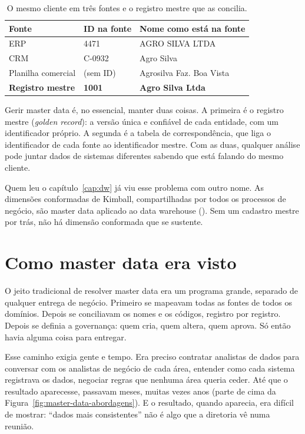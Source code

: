 \begin{table}[htbp]
  \centering
  \caption{O mesmo cliente em três fontes e o registro mestre que as concilia.}
  \label{tab:registro-mestre}
  \small
  \begin{tabular}{@{}lll@{}}
    \toprule
    Fonte & ID na fonte & Nome como está na fonte \\
    \midrule
    ERP                & 4471          & AGRO SILVA LTDA \\
    CRM                & C-0932        & Agro Silva \\
    Planilha comercial & (sem ID)      & Agrosilva Faz. Boa Vista \\
    \midrule
    \textbf{Registro mestre} & \textbf{1001} & \textbf{Agro Silva Ltda} \\
    \bottomrule
  \end{tabular}
\end{table}

Gerir master data é, no essencial, manter duas coisas. A primeira é o registro mestre
(\emph{golden record}): a versão única e confiável de cada entidade, com um identificador
próprio. A segunda é a tabela de correspondência, que liga o identificador de cada fonte ao
identificador mestre. Com as duas, qualquer análise pode juntar dados de sistemas
diferentes sabendo que está falando do mesmo cliente.

Quem leu o capítulo~\ref{cap:dw} já viu esse problema com outro nome. As dimensões
conformadas de Kimball, compartilhadas por todos os processos de negócio, são master data
aplicado ao data warehouse (). Sem um cadastro mestre por trás, não há
dimensão conformada que se sustente.

\section{Como master data era visto}
\label{sec:master-data-antes}

O jeito tradicional de resolver master data era um programa grande, separado de qualquer
entrega de negócio. Primeiro se mapeavam todas as fontes de todos os domínios. Depois se
conciliavam os nomes e os códigos, registro por registro. Depois se definia a governança:
quem cria, quem altera, quem aprova. Só então havia alguma coisa para entregar.

Esse caminho exigia gente e tempo. Era preciso contratar analistas de dados para
conversar com os analistas de negócio de cada área, entender como cada sistema registrava
os dados, negociar regras que nenhuma área queria ceder. Até que o resultado aparecesse,
passavam meses, muitas vezes anos (parte de cima da Figura~\ref{fig:master-data-abordagens}).
E o resultado, quando aparecia, era difícil de mostrar: \enquote{dados mais consistentes}
não é algo que a diretoria vê numa reunião.

